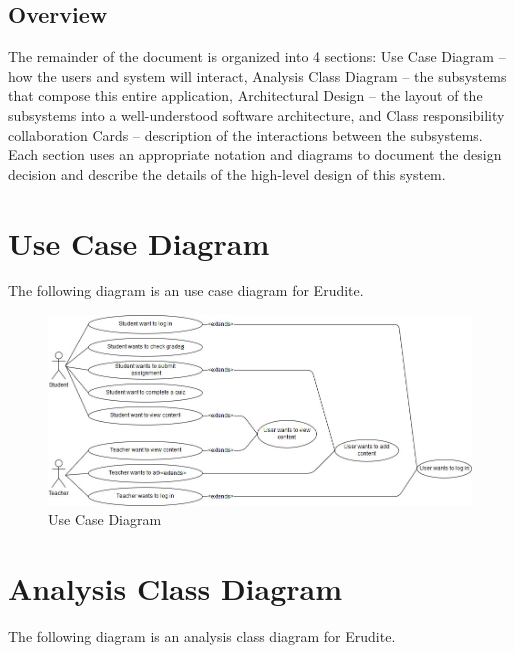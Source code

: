 \documentclass[]{article}
\begin{document}
\subsection{Overview}
\label{sub:overview}
The remainder of the document is organized into 4 sections: Use Case Diagram --
how the users and system will interact, Analysis Class Diagram -- the
subsystems that compose this entire application, Architectural Design -- the
layout of the subsystems into a well-understood software architecture, and
Class responsibility collaboration Cards -- description of the interactions
between the subsystems. Each section uses an appropriate notation and diagrams
to document the design decision and describe the details of the high-level
design of this system.




\newpage

\section{Use Case Diagram}
\label{sec:use_case_diagram}
The following diagram is an use case diagram for Erudite.\\

{
\begin{figure}[h]
  \centering
  \includegraphics[scale=0.40]{A2_Assets/Use_Case_Diagram_v1.jpg}
  \caption{Use Case Diagram}
\end{figure}
}

\newpage

\section{Analysis Class Diagram}
\label{sec:analysis_class_diagram}
The following diagram is an analysis class diagram for Erudite.\\
\end{document}
